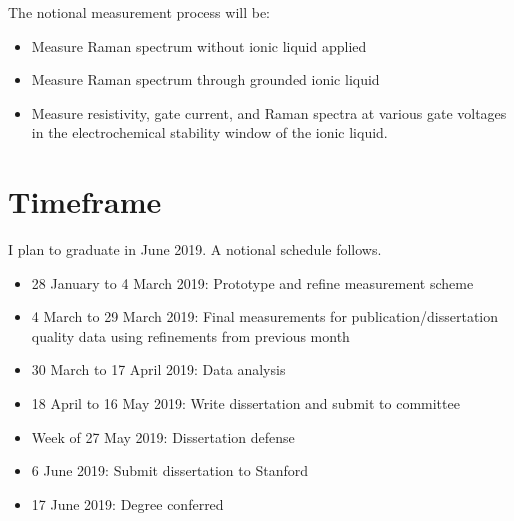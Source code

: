 \documentclass[11pt]{article}
\begin{document}
The notional measurement process will be:

\begin{itemize}
	\item Measure Raman spectrum without ionic liquid applied
	\item Measure Raman spectrum through grounded ionic liquid
	\item Measure \rucl resistivity, gate current, and Raman spectra at various gate voltages in the electrochemical stability window of the ionic liquid. 
\end{itemize}

\section{Timeframe}
I plan to graduate in June 2019. A notional schedule follows.

\begin{itemize}
	\item 28 January to 4 March 2019: Prototype and refine measurement scheme
	\item 4 March to 29 March 2019: Final measurements for publication/dissertation quality data using refinements from previous month
	\item 30 March to 17 April 2019: Data analysis
	\item 18 April to 16 May 2019: Write dissertation and submit to committee
	\item Week of 27 May 2019: Dissertation defense
	\item 6 June 2019: Submit dissertation to Stanford
	\item 17 June 2019: Degree conferred	
\end{itemize}



\end{document}
